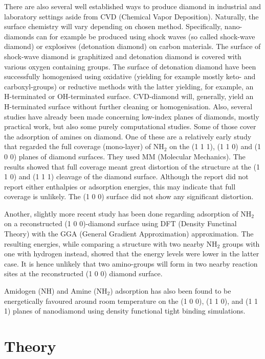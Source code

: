 \documentclass[12pt,a4paper]{article}
\begin{document}
There are also several well established ways to produce diamond in industrial and laboratory settings aside from CVD (Chemical Vapor Deposition). Naturally, the surface chemistry will vary depending on chosen method. Specifically, nano-diamonds can for example be produced using shock waves (so called shock-wave diamond) or explosives (detonation diamond) on carbon materials. The surface of shock-wave diamond is graphitized and detonation diamond is covered with various oxygen containing groups. The surface of detonation diamond have been successfully homogenised using oxidative (yielding for example mostly keto- and carboxyl-groups) or reductive methods with the latter yielding, for example, an H-terminated or OH-terminated surface. CVD-diamond will, generally, yield an H-terminated surface without further cleaning or homogenisation.\cite{ankekrueger2007} Also, several studies have already been made concerning low-index planes of diamonds, mostly practical work, but also some purely computational studies. Some of those cover the adsorption of amines on diamond.  One of these are a relatively early study that regarded the full coverage (mono-layer) of NH$_2$ on the (1 1 1), (1 1 0) and (1 0 0) planes of diamond surfaces. They used MM (Molecular Mechanics). The results showed that full coverage meant great distortion of the structure at the (1 1 0) and (1 1 1) cleavage of the diamond surface. Although the report did not report either enthalpies or adsorption energies, this may indicate that full coverage is unlikely. The (1 0 0) surface did not show any significant distortion. \cite{johnb.miller2001}

Another, slightly more recent study has been done regarding adsorption of NH$_2$ on a reconstructed (1 0 0)-diamond surface using DFT (Density Functinal Theory) with the GGA (General Gradient Approximation) approximation. The resulting energies, while comparing a structure with two nearby NH$_2$ groups with one with hydrogen instead, showed that the energy levels were lower in the latter case. It is hence unlikely that two amino-groups will form in two nearby reaction sites at the reconstructed (1 0 0) diamond surface. \cite{yan.dong2010}

Amidogen (NH) and Amine (NH$_2$) adsorption has also been found to be energetically favoured around room temperature on the (1 0 0), (1 1 0), and (1 1 1) planes of nanodiamond using density functional tight binding simulations.  \cite{lin.lai2011}

\section{Theory}
\end{document}
